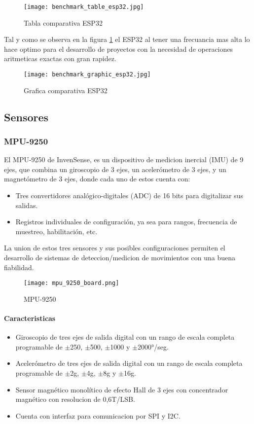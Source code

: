 \begin{figure}[htp!]
    \centering
    \texttt{[image: benchmark\_table\_esp32.jpg]}
    \caption{Tabla comparativa ESP32}
    \label{fig: table_benchmark}
\end{figure}
\FloatBarrier

Tal y como se observa en la figura \ref{fig: table_benchmark} el ESP32 al tener una frecuancia mas alta lo hace optimo para el desarrollo de proyectos con la necesidad de operaciones aritmeticas exactas con gran rapidez.
\begin{figure}[htp!]
    \centering
    \texttt{[image: benchmark\_graphic\_esp32.jpg]}
    \caption{Grafica comparativa ESP32}
    \label{fig: graphic_benchmark}
\end{figure}
\FloatBarrier

\subsection{Sensores}
\subsubsection{MPU-9250}
El MPU-9250 de InvenSense, es un dispositivo de medicion inercial (IMU) de 9 ejes, que combina
un giroscopio de 3 ejes, un acelerómetro de 3 ejes, y un magnetómetro de 3 ejes, donde cada
uno de estos cuenta con:
\begin{itemize}
    \item Tres convertidores analógico-digitales (ADC) de 16 bits para digitalizar sus salidas.
    \item Registros individuales de configuración, ya sea para rangos, frecuencia de muestreo, habilitación, etc.
\end{itemize}

La union de estos tres sensores y sus posibles configuraciones permiten el desarrollo de sistemas de deteccion/medicion de
movimientos con una buena fiabilidad.

\begin{figure}[htp]
    \centering
    \texttt{[image: mpu\_9250\_board.png]}
    \caption{MPU-9250 }
\end{figure}

\paragraph{Caracteristicas}
\begin{itemize}
    \item Giroscopio de tres ejes de salida digital con un rango de escala completa programable de $ \pm $250, $ \pm $500, $ \pm $1000 y $ \pm $2000°/seg.
    \item Acelerómetro de tres ejes de salida digital con un rango de escala completa programable de $ \pm $2g, $ \pm $4g, $ \pm $8g y $ \pm $16g.
    \item Sensor magnético monolítico de efecto Hall de 3 ejes con concentrador magnético con resolucion de 0,6T/LSB.
    \item Cuenta con interfaz para comunicacion por SPI y I2C.
\end{itemize}

